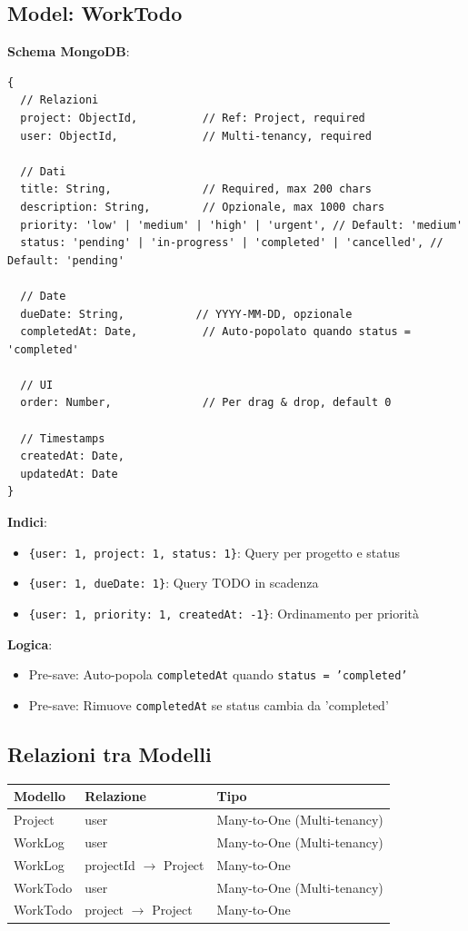 \documentclass[11pt,a4paper]{article}
\begin{document}
\subsection{Model: WorkTodo}

\textbf{Schema MongoDB}:

\begin{lstlisting}
{
  // Relazioni
  project: ObjectId,          // Ref: Project, required
  user: ObjectId,             // Multi-tenancy, required
  
  // Dati
  title: String,              // Required, max 200 chars
  description: String,        // Opzionale, max 1000 chars
  priority: 'low' | 'medium' | 'high' | 'urgent', // Default: 'medium'
  status: 'pending' | 'in-progress' | 'completed' | 'cancelled', // Default: 'pending'
  
  // Date
  dueDate: String,           // YYYY-MM-DD, opzionale
  completedAt: Date,          // Auto-popolato quando status = 'completed'
  
  // UI
  order: Number,              // Per drag & drop, default 0
  
  // Timestamps
  createdAt: Date,
  updatedAt: Date
}
\end{lstlisting}

\textbf{Indici}:
\begin{itemize}
    \item \texttt{\{user: 1, project: 1, status: 1\}}: Query per progetto e status
    \item \texttt{\{user: 1, dueDate: 1\}}: Query TODO in scadenza
    \item \texttt{\{user: 1, priority: 1, createdAt: -1\}}: Ordinamento per priorità
\end{itemize}

\textbf{Logica}:
\begin{itemize}
    \item Pre-save: Auto-popola \texttt{completedAt} quando \texttt{status = 'completed'}
    \item Pre-save: Rimuove \texttt{completedAt} se status cambia da 'completed'
\end{itemize}

\subsection{Relazioni tra Modelli}

\begin{center}
\begin{tabular}{|l|l|l|}
\hline
\textbf{Modello} & \textbf{Relazione} & \textbf{Tipo} \\
\hline
Project & user & Many-to-One (Multi-tenancy) \\
WorkLog & user & Many-to-One (Multi-tenancy) \\
WorkLog & projectId $\rightarrow$ Project & Many-to-One \\
WorkTodo & user & Many-to-One (Multi-tenancy) \\
WorkTodo & project $\rightarrow$ Project & Many-to-One \\
\hline
\end{tabular}
\end{center}
\end{document}
